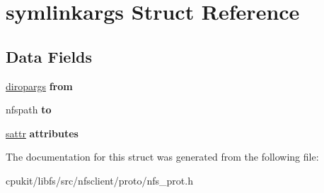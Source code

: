 \hypertarget{structsymlinkargs}{}\section{symlinkargs Struct Reference}
\label{structsymlinkargs}
\subsection*{Data Fields}
\begin{DoxyCompactItemize}
\item 
\mbox{\label{structsymlinkargs_a67a0c8c443b471483bcb1a80dd490f46}} 
\mbox{\hyperlink{structdiropargs}{diropargs}} {\bfseries from}
\item 
\mbox{\label{structsymlinkargs_aa08a2857d615552a75cfb58a505c0157}} 
nfspath {\bfseries to}
\item 
\mbox{\label{structsymlinkargs_a7edd3601fda54ed798105868de10aac1}} 
\mbox{\hyperlink{structsattr}{sattr}} {\bfseries attributes}
\end{DoxyCompactItemize}


The documentation for this struct was generated from the following file\+:\begin{DoxyCompactItemize}
\item 
cpukit/libfs/src/nfsclient/proto/nfs\+\_\+prot.\+h\end{DoxyCompactItemize}
